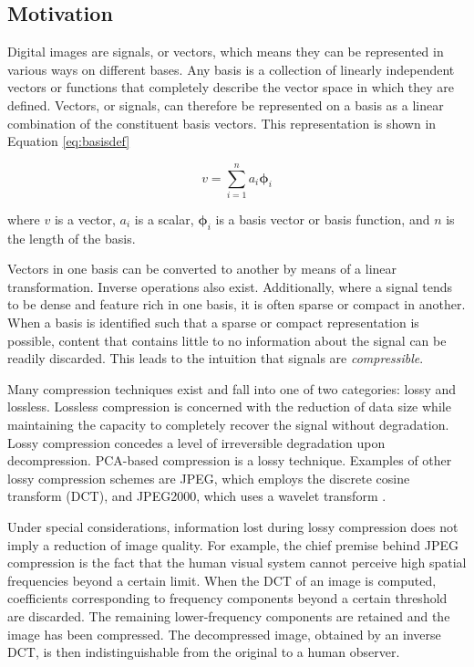 \documentclass[conference]{IEEEtran}
\begin{document}
    \subsection{Motivation}
    Digital images are signals, or vectors, which means they can be represented in various ways on different bases. Any basis is a collection of linearly independent vectors or functions that completely describe the vector space in which they are defined. Vectors, or signals, can therefore be represented on a basis as a linear combination of the constituent basis vectors. This representation is shown in Equation \ref{eq:basisdef}

    \begin{equation}
        v = \sum_{i=1}^{n} a_i \mathbf{\phi}_{i}
    \label{eq:basisdef}
    \end{equation}

    where $v$ is a vector, $a_i$ is a scalar, $\mathbf{\phi}_{i}$ is a basis vector or basis function, and $n$ is the length of the basis.

    Vectors in one basis can be converted to another by means of a linear transformation. Inverse operations also exist. Additionally, where a signal tends to be dense and feature rich in one basis, it is often sparse or compact in another. When a basis is identified such that a sparse or compact representation is possible, content that contains little to no information about the signal can be readily discarded. This leads to the intuition that signals are \textit{compressible}.

    Many compression techniques exist and fall into one of two categories: lossy and lossless. Lossless compression is concerned with the reduction of data size while maintaining the capacity to  completely recover the signal without degradation. Lossy compression concedes a level of irreversible degradation upon decompression. PCA-based compression is a lossy technique. Examples of other lossy compression schemes are JPEG, which employs the discrete cosine transform (DCT), and JPEG2000, which uses a wavelet transform \cite{jpeg_compression}\cite{jpeg2000_compression}.
    
    Under special considerations, information lost during lossy compression does not imply a reduction of image quality. For example, the chief premise behind JPEG compression is the fact that the human visual system cannot perceive high spatial frequencies beyond a certain limit. When the DCT of an image is computed, coefficients corresponding to frequency components beyond a certain threshold are discarded. The remaining lower-frequency components are retained and the image has been compressed. The decompressed image, obtained by an inverse DCT, is then indistinguishable from the original to a human observer.
\end{document}
